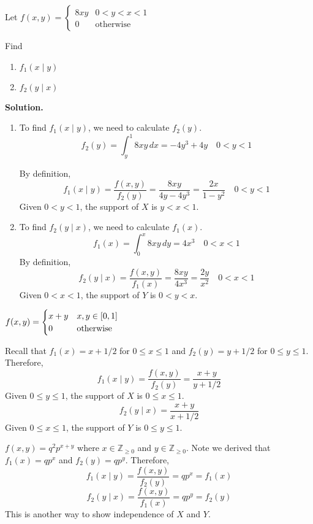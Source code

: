 \begin{Example}{}{}
    Let $ \displaystyle f(x,y)=\begin{cases}
            8 x y & 0<y<x<1          \\
            0     & \text{otherwise}
        \end{cases}  $

    Find
    \begin{enumerate}[label=(\roman*)]
        \item $ f_1(x\mid y) $
        \item $ f_2(y\mid x) $
    \end{enumerate}
    \textbf{Solution.}
    \begin{enumerate}[label=(\roman*)]
        \item To find $ f_1(x\mid y) $, we need to calculate
              $ f_2(y) $.
              \[ f_2(y)=\int_{y}^{1} 8xy\, d{x}=-4y^3+4y \quad 0<y<1 \]

              By definition,
              \[ f_1(x\mid y)=\frac{f(x,y)}{f_2(y)}=
                  \frac{8xy}{4y-4y^3}=\frac{2x}{1-y^2} \quad 0<y<1 \]
              Given $ 0<y<1 $, the support
              of $ X $ is $ y<x<1 $.
        \item To find $ f_2(y\mid x) $, we need to calculate $ f_1(x) $.
              \[ f_1(x)=\int_{0}^{x} 8xy\, d{y}=4x^3\quad 0<x<1 \]
              By definition,
              \[ f_2(y\mid x)=\frac{f(x,y)}{f_1(x)} =\frac{8xy}{4x^3} =\frac{2y}{x^2} \quad 0<x<1 \]
              Given $ 0<x<1 $, the support of $ Y $ is $ 0<y<x $.
    \end{enumerate}
\end{Example}
\begin{Example}{}{}
    $ \displaystyle f(x,y)=\begin{cases}
            x+y & x,y\in\interval{0}{1} \\
            0   & \text{otherwise}
        \end{cases} $

    Recall that $ f_1(x)=x+1/2 $ for $ 0\le x\le 1 $ and
    $ f_2(y)=y+1/2 $ for $ 0\le y\le 1 $. Therefore,
    \[ f_1(x\mid y)=\frac{f(x,y)}{f_2(y)} =\frac{x+y}{y+1/2} \]
    Given $ 0\le y\le 1 $, the support of $ X $ is $ 0\le x\le 1 $.
    \[ f_2(y\mid x)=\frac{x+y}{x+1/2} \]
    Given $ 0\le x\le 1 $, the support of $ Y $ is $ 0\le y\le 1 $.
\end{Example}
\begin{Example}{}{}
    $ f(x,y)=q^2p^{x+y} $ where $ x\in\mathbb{Z}_{\ge 0} $
    and $ y\in\mathbb{Z}_{\ge 0} $. Note we derived
    that $ f_1(x)=qp^x $ and $ f_2(y)=qp^y $. Therefore,
    \[ f_1(x\mid y)=\frac{f(x,y)}{f_2(y)} =qp^x=f_1(x) \]
    \[ f_2(y\mid x)=\frac{f(x,y)}{f_1(x)}=qp^y=f_2(y) \]
    This is another way to show independence of $ X $ and $ Y $.
\end{Example}
